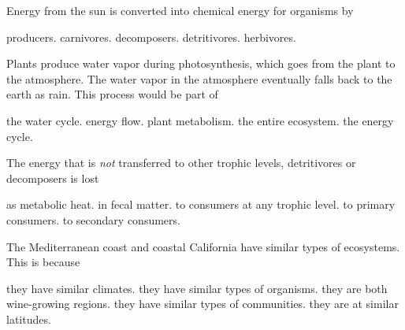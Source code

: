 \question
Energy from the sun is converted into chemical energy for organisms by

\begin{choices}
\correctchoice producers.%
\choice carnivores.%
\choice decomposers.%
\choice detritivores.%
\choice herbivores.%
\end{choices}

\question
Plants produce water vapor during photosynthesis, which goes from the plant to the atmosphere. The water vapor in the atmosphere eventually falls back to the earth as rain. This process would be part of

\begin{choices}
\correctchoice the water cycle.%
\choice energy flow.%
\choice plant metabolism.%
\choice the entire ecosystem.%
\choice the energy cycle.%
\end{choices}

\question
The energy that is \textit{not} transferred to other trophic levels, detritivores or decomposers is lost

\begin{choices}
\correctchoice as metabolic heat.%
\choice in fecal matter.%
\choice to consumers at any trophic level.%
\choice to primary consumers.%
\choice to secondary consumers.%
\end{choices}


\question
The Mediterranean coast and coastal California have similar types of ecosystems. This is because

\begin{choices}
\correctchoice they have similar climates.%
\choice they have similar types of organisms.%
\choice they are both wine-growing regions.%
\choice they have similar types of communities.%
\choice they are at similar latitudes.%
\end{choices}



